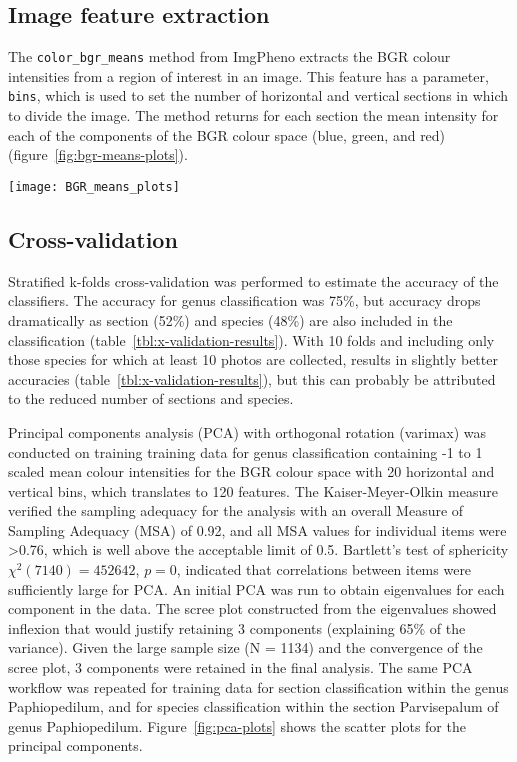 \documentclass[review,3p,twocolumn]{elsarticle}
\begin{document}
\subsection{Image feature extraction}

The \verb/color_bgr_means/ method from ImgPheno extracts the BGR colour intensities from a region of interest in an image. This feature has a parameter, \verb/bins/, which is used to set the number of horizontal and vertical sections in which to divide the image. The method returns for each section the mean intensity for each of the components of the BGR colour space (blue, green, and red) (figure~\ref{fig:bgr-means-plots}).

\begin{figure*}[t]
    \centering
    \texttt{[image: BGR\_means\_plots]}
    \caption{Plots of the mean BGR colour intensities for an image of \textit{P. druryi}. The plots display the mean intensities for the horizontal and vertical bins respectively.}
    \label{fig:bgr-means-plots}
\end{figure*}

\subsection{Cross-validation}

Stratified k-folds cross-validation was performed to estimate the accuracy of the classifiers. The accuracy for genus classification was 75\%, but accuracy drops dramatically as section (52\%) and species (48\%) are also included in the classification (table~\ref{tbl:x-validation-results}). With 10 folds and including only those species for which at least 10 photos are collected, results in slightly better accuracies (table~\ref{tbl:x-validation-results}), but this can probably be attributed to the reduced number of sections and species.

Principal components analysis (PCA) with orthogonal rotation (varimax) was conducted on training training data for genus classification containing -1 to 1 scaled mean colour intensities for the BGR colour space with 20 horizontal and vertical bins, which translates to 120 features. The Kaiser-Meyer-Olkin measure verified the sampling adequacy for the analysis with an overall Measure of Sampling Adequacy (MSA) of 0.92, and all MSA values for individual items were >0.76, which is well above the acceptable limit of 0.5. Bartlett's test of sphericity $\chi^2 (7140) = 452642$, $p = 0$, indicated that correlations between items were sufficiently large for PCA. An initial PCA was run to obtain eigenvalues for each component in the data. The scree plot constructed from the eigenvalues showed inflexion that would justify retaining 3 components (explaining 65\% of the variance). Given the large sample size (N = 1134) and the convergence of the scree plot, 3 components were retained in the final analysis. The same PCA workflow was repeated for training data for section classification within the genus Paphiopedilum, and for species classification within the section Parvisepalum of genus Paphiopedilum. Figure~\ref{fig:pca-plots} shows the scatter plots for the principal components.
\end{document}
